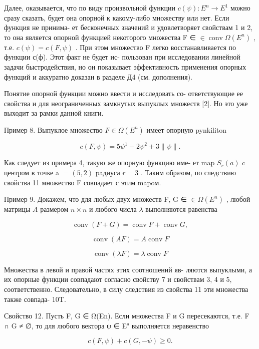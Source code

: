 \documentclass[8pt]{extarticle}
\begin{document}
Далее, оказывается, что по виду произвольной функции \(c\left( \psi \right)  : {E}^{n} \rightarrow  {E}^{1}\) можно сразу сказать, будет она опорной к какому-либо множеству или нет. Если функция не принима- ет бесконечных значений и удовлетворяет свойствам 1 и 2, то она является опорной функцией некоторого множества F ∈ \(\in  \operatorname{conv}\Omega \left( {E}^{n}\right)\) , т.е. \(c\left( \psi \right)  = c\left( {F,\psi }\right)\) . При этом множество F легко восстанавливается по функции с(ф). Этот факт не будет ис- пользован при исследовании линейной задачи быстродействия, но он показывает эффективность применения опорных функций и аккуратно доказан в разделе Д4 (см. дополнения).

Понятие опорной функции можно ввести и исследовать со- ответствующие ее свойства и для неограниченных замкнутых выпуклых множеств [2]. Но это уже выходит за рамки данной книги.

Пример 8. Выпуклое множество \(F \in  \Omega \left( {E}^{n}\right)\) имеет опорную pynkiliton

\[
c\left( {F,\psi }\right)  = 5{\psi }^{1} + 2{\psi }^{2} + 3\parallel \psi \parallel .
\]

Как следует из примера 4, такую же опорную функцию име- ет map \({S}_{r}\left( a\right)\) c центром в точке a \(= \left( {5,2}\right)\) paдиуса \(r = 3\) . Таким образом, по следствию свойства 11 множество F совпадает с этим mapoм.

Пример 9. Докажем, что для любых двух множеств F, G ∈ \(\in  \Omega \left( {E}^{n}\right)\) , любой матрицы \(A\) размером \(n \times  n\) и любого числа \(\lambda\) выполняются равенства

\[
\operatorname{conv}\left( {F + G}\right)  = \operatorname{conv}F + \operatorname{conv}G,
\]

\[
\operatorname{conv}\left( {AF}\right)  = A\operatorname{conv}F
\]

\[
\operatorname{conv}\left( {\lambda F}\right)  = \lambda \operatorname{conv}F
\]

Множества в левой и правой частях этих соотношений яв- ляются выпуклыми, а их опорные функции совпадают согласно свойству 7 и свойствам 3, 4 и 5, соответственно. Следовательно, в силу следствия из свойства 11 эти множества также совпада- 10T.

Свойство 12. Пусть F, G ∈ Ω(En). Если множества F и G пересекаются, т.е. F ∩ G ≠ ∅, то для любого вектора ψ ∈ E" выполняется неравенство

\[
c\left( {F,\psi }\right)  + c\left( {G, - \psi }\right)  \geq  0. \tag{3.13}
\]
\end{document}
